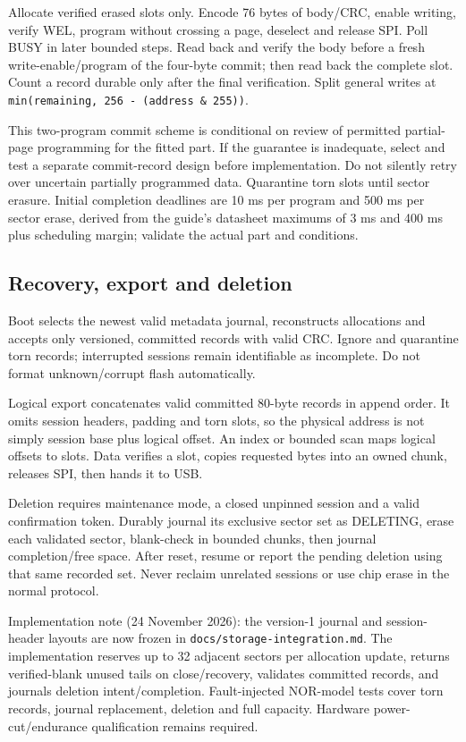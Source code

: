 Allocate verified erased slots only. Encode 76 bytes of body/CRC, enable writing, verify WEL, program without crossing a page, deselect and release SPI. Poll BUSY in later bounded steps. Read back and verify the body before a fresh write-enable/program of the four-byte commit; then read back the complete slot. Count a record durable only after the final verification. Split general writes at \texttt{min(remaining, 256 - (address \& 255))}.

This two-program commit scheme is conditional on review of permitted partial-page programming for the fitted part. If the guarantee is inadequate, select and test a separate commit-record design before implementation. Do not silently retry over uncertain partially programmed data. Quarantine torn slots until sector erasure. Initial completion deadlines are 10 ms per program and 500 ms per sector erase, derived from the guide's datasheet maximums of 3 ms and 400 ms plus scheduling margin; validate the actual part and conditions.

\subsection{Recovery, export and deletion}
Boot selects the newest valid metadata journal, reconstructs allocations and accepts only versioned, committed records with valid CRC. Ignore and quarantine torn records; interrupted sessions remain identifiable as incomplete. Do not format unknown/corrupt flash automatically.

Logical export concatenates valid committed 80-byte records in append order. It omits session headers, padding and torn slots, so the physical address is not simply session base plus logical offset. An index or bounded scan maps logical offsets to slots. Data verifies a slot, copies requested bytes into an owned chunk, releases SPI, then hands it to USB.

Deletion requires maintenance mode, a closed unpinned session and a valid confirmation token. Durably journal its exclusive sector set as DELETING, erase each validated sector, blank-check in bounded chunks, then journal completion/free space. After reset, resume or report the pending deletion using that same recorded set. Never reclaim unrelated sessions or use chip erase in the normal protocol.

Implementation note (24 November 2026): the version-1 journal and session-header layouts are now frozen in \texttt{docs/storage-integration.md}. The implementation reserves up to 32 adjacent sectors per allocation update, returns verified-blank unused tails on close/recovery, validates committed records, and journals deletion intent/completion. Fault-injected NOR-model tests cover torn records, journal replacement, deletion and full capacity. Hardware power-cut/endurance qualification remains required.
